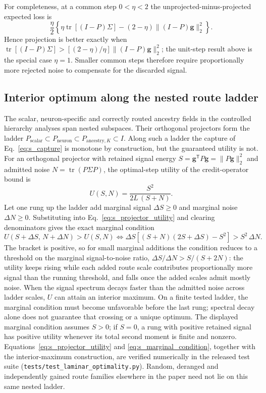 For completeness, at a common step $0<\eta<2$ the unprojected-minus-projected
expected loss is
\begin{equation}
\frac{\eta}{2}\left\{
\eta\operatorname{tr}[(I-P)\Sigma]
-(2-\eta)\lVert(I-P)\bm g\rVert_2^2
\right\}.
\end{equation}
Hence projection is better exactly when
$\operatorname{tr}[(I-P)\Sigma]>
[(2-\eta)/\eta]\lVert(I-P)\bm g\rVert_2^2$; the unit-step result above is the
special case $\eta=1$. Smaller common steps therefore require proportionally
more rejected noise to compensate for the discarded signal.

\subsection{Interior optimum along the nested route ladder}
\label{note:interior_optimum}

The scalar, neuron-specific and correctly routed ancestry fields in the
controlled hierarchy analyses span nested subspaces. Their orthogonal
projectors form the ladder
$P_{\mathrm{scalar}}\subset P_{\mathrm{neuron}}\subset
P_{\mathrm{ancestry},K}\subset I$. Along such a ladder the capture of
Eq.~\ref{eq:s_capture} is monotone by construction, but the guaranteed
utility is not. For an orthogonal projector with retained signal energy
$S=\bm g^{\mathsf T}P\bm g=\lVert P\bm g\rVert_2^2$ and admitted noise
$N=\operatorname{tr}(P\Sigma P)$, the optimal-step utility of the
credit-operator bound is
\begin{equation}
U(S,N)=\frac{S^2}{2L\,(S+N)} .
\label{eq:s_projector_utility}
\end{equation}
Let one rung up the ladder add marginal signal $\Delta S\geq0$ and marginal
noise $\Delta N\geq0$. Substituting into Eq.~\ref{eq:s_projector_utility}
and clearing denominators gives the exact marginal condition
\begin{equation}
U(S+\Delta S,\,N+\Delta N)>U(S,N)
\iff
\Delta S\left[(S+N)(2S+\Delta S)-S^2\right]>S^2\,\Delta N .
\label{eq:s_marginal_condition}
\end{equation}
The bracket is positive, so for small marginal additions the condition
reduces to a threshold on the marginal signal-to-noise ratio,
$\Delta S/\Delta N>S/(S+2N)$: the utility keeps rising while each added
route scale contributes proportionally more signal than the running
threshold, and falls once the added scales admit mostly noise. When the
signal spectrum decays faster than the admitted noise across ladder scales,
$U$ can attain an interior maximum. On a finite tested ladder, the marginal
condition must become unfavorable before the last rung; spectral decay alone
does not guarantee that crossing or a unique optimum. The displayed marginal
condition assumes $S>0$; if $S=0$, a rung with positive retained signal has
positive utility whenever its total second moment is finite and nonzero.
Equations~\ref{eq:s_projector_utility} and
\ref{eq:s_marginal_condition}, together with the interior-maximum
construction, are verified numerically in the released test suite
(\texttt{tests/test\_laminar\_optimality.py}).
Random, deranged and independently gained route families elsewhere in the
paper need not lie on this same nested ladder.


